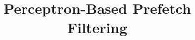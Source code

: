 \documentclass{sig-alternate}
\title{Perceptron-Based Prefetch Filtering}
\author{}
\begin{document}
\maketitle
\thispagestyle{firstpage}
\pagestyle{plain}

\begin{spacing}{0.99}









\end{spacing}




\end{document}
